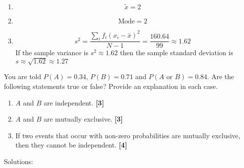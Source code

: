 \documentclass[a4paper, leqno, 12pt]{article} %
\newenvironment{top_enumerate}{
\begin{enumerate}
  \setlength{\itemsep}{2em}
  \setlength{\topsep}{-0pt}
  \setlength{\partopsep}{-0pt}
}{\end{enumerate}}
\begin{document}
\begin{top_enumerate}
\begin{enumerate}
	\[
	\bar x = \frac{\sum_i f_i x_i}{N} =\frac{244}{100} = {2.44}
	\]
	 \quad \textbf{}
		\item \[
	\tilde x = {2}
	\]
	 \quad \textbf{}
		\item \[
	\textrm{Mode} = {2}
	\]
	 \quad \textbf{}
		\item \[
	s^2 = \frac{\sum_i f_i (x_i-\bar x)^2}{N-1} =\frac{{160.64}}{99} \approx {1.62}
	\]
	If the sample variance is $s^2 \approx {1.62}$ then the sample standard deviation is $s \approx \sqrt{{1.62}} \approx {1.27}$
	 \quad \textbf{}
\end{enumerate}\newpage
\item You are told $P(A) = {0.34}$, $P(B) = {0.71}$ and $P(A \textrm{ or } B) = {0.84}$. Are the following statements true or false? Provide an explanation in each case.
 
\setcounter{equation}{0}  %
\begin{enumerate}
	\setlength{\topsep}{-0pt}
	\setlength{\partopsep}{-0pt}
	\setlength{\itemsep}{10pt}
			\item $A$ and $B$ are independent.
	 \quad \textbf{[3]}
		\item $A$ and $B$ are mutually exclusive.
	 \quad \textbf{[3]}
		\item If two events that occur with non-zero probabilities are mutually exclusive, then they cannot be independent.
	 \quad \textbf{[4]}
\end{enumerate}\addtocounter{enumi}{-1}
\item Solutions:
 

\end{top_enumerate}
\end{document}
